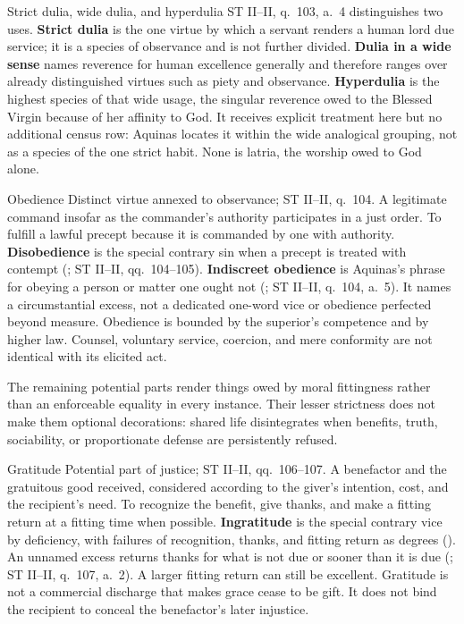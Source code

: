 \begin{studybox}{Strict dulia, wide dulia, and hyperdulia}
ST II--II, q.~103, a.~4 distinguishes two uses. \textbf{Strict dulia} is the one virtue by which a servant renders a human lord due service; it is a species of observance and is not further divided. \textbf{Dulia in a wide sense} names reverence for human excellence generally and therefore ranges over already distinguished virtues such as piety and observance. \textbf{Hyperdulia} is the highest species of that wide usage, the singular reverence owed to the Blessed Virgin because of her affinity to God. It receives explicit treatment here but no additional census row: Aquinas locates it within the wide analogical grouping, not as a species of the one strict habit. None is latria, the worship owed to God alone.
\end{studybox}

\virtuedossier
  {Obedience}
  {Distinct virtue annexed to observance; ST II--II, q.~104.}
  {A legitimate command insofar as the commander's authority participates in a just order.}
  {To fulfill a lawful precept because it is commanded by one with authority.}
  {\textbf{Disobedience} is the special contrary sin when a precept is treated with contempt (; ST II--II, qq.~104--105).}
  {\textbf{Indiscreet obedience} is Aquinas's phrase for obeying a person or matter one ought not (; ST II--II, q.~104, a.~5). It names a circumstantial excess, not a dedicated one-word vice or obedience perfected beyond measure.}
  {Obedience is bounded by the superior's competence and by higher law. Counsel, voluntary service, coercion, and mere conformity are not identical with its elicited act.}


The remaining potential parts render things owed by moral fittingness rather than an enforceable equality in every instance. Their lesser strictness does not make them optional decorations: shared life disintegrates when benefits, truth, sociability, or proportionate defense are persistently refused.

\virtuedossier
  {Gratitude}
  {Potential part of justice; ST II--II, qq.~106--107.}
  {A benefactor and the gratuitous good received, considered according to the giver's intention, cost, and the recipient's need.}
  {To recognize the benefit, give thanks, and make a fitting return at a fitting time when possible.}
  {\textbf{Ingratitude} is the special contrary vice by deficiency, with failures of recognition, thanks, and fitting return as degrees ().}
  {An unnamed excess returns thanks for what is not due or sooner than it is due (; ST II--II, q.~107, a.~2). A larger fitting return can still be excellent.}
  {Gratitude is not a commercial discharge that makes grace cease to be gift. It does not bind the recipient to conceal the benefactor's later injustice.}

